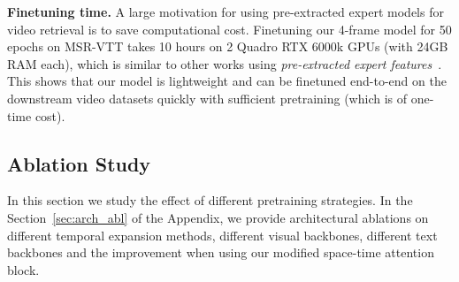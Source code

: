 \noindent\textbf{Finetuning time.}
A large motivation for using pre-extracted expert models for video retrieval is to save computational cost. Finetuning our 4-frame model for 50 epochs on MSR-VTT takes 10 hours on 2 Quadro RTX 6000k GPUs (with 24GB RAM each), which is similar to other works using \textit{pre-extracted expert features}~\cite{patrick2020support}. This shows that our model is lightweight and can be finetuned end-to-end on the downstream video datasets quickly with sufficient pretraining (which is of one-time cost).
\subsection{Ablation Study}
\label{subsec:ablation}

\begin{table}\centering
\caption{\textbf{Pretraining sources:} The effect of different pretraining sources. We use 4 frames per video in both pretraining and finetuning. Pretraining is performed for 1 full epoch only. Results are presented on the 1K-A MSR-VTT test set for text-video retrieval. \textbf{R@k:} Recall@K. \textbf{MedR:} Median Rank}
\label{tab:pretraining}
\end{table} 
In this section we study the effect of different pretraining strategies. In the Section~\ref{sec:arch_abl} of the Appendix, we provide architectural ablations on different temporal expansion methods, different visual backbones, different text backbones and the improvement when using our modified space-time attention block.

